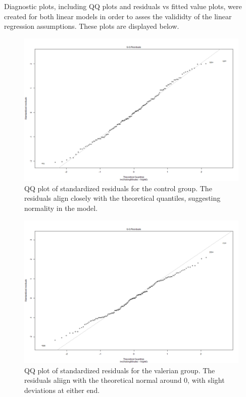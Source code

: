 \documentclass[10pt,preprintnumbers,amsmath,amssymb,floatfix,twocolumn,prl]{revtex4-2}
\begin{document}
Diagnostic plots, including QQ plots and residuals vs fitted value plots, were created for both linear models in order to asses the valididty of the linear regression assumptions. These plots are displayed below. 
\begin{figure}[H]
\centering
\includegraphics[width=0.95\linewidth]{QQ_control.png}
\caption{QQ plot of standardized residuals for the control group. The residuals align closely with the theoretical quantiles, suggesting normality in the model.}
\end{figure}

\begin{figure}[H]
\centering
\includegraphics[width=0.95\linewidth]{QQ_valerian.png}
\caption{QQ plot of standardized residuals for the valerian group. The residuals aliign with the theoretical normal around 0, with slight deviations at either end.}
\end{figure}
\end{document}
